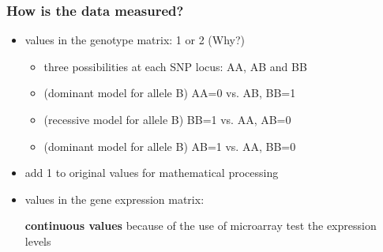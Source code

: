 \begin{frame}\frametitle{How is the data measured?}
    \begin{itemize}
        \item values in the genotype matrix: 1 or 2 (Why?)
    	 \begin{itemize}
    	 	\item three possibilities at each SNP locus: AA, AB and BB
    	 	\item(dominant model for allele B) AA=0 vs. AB, BB=1 
    	 	\item(recessive model for allele B) BB=1 vs. AA, AB=0
    	 	\item(dominant model for allele B) AB=1 vs. AA, BB=0
    	 \end{itemize}
        
        \item add 1 to original values for  mathematical processing

        \item values in the gene expression matrix:  
        
        \textbf{continuous values} because of the use of microarray test the expression levels
      
    \end{itemize}
\end{frame}




   


